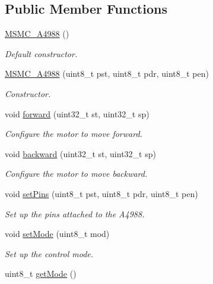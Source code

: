\subsection*{Public Member Functions}
\begin{DoxyCompactItemize}
\item 
\hyperlink{class_m_s_m_c___a4988_a3ea9fb71304c6a21695947fde680ee48}{M\+S\+M\+C\+\_\+\+A4988} ()
\begin{DoxyCompactList}\small\item\em Default constructor. \end{DoxyCompactList}\item 
\hyperlink{class_m_s_m_c___a4988_af2633e82e29d622a4fb5b5f8f6b77446}{M\+S\+M\+C\+\_\+\+A4988} (uint8\+\_\+t pst, uint8\+\_\+t pdr, uint8\+\_\+t pen)
\begin{DoxyCompactList}\small\item\em Constructor. \end{DoxyCompactList}\item 
void \hyperlink{class_m_s_m_c___a4988_a9acdbabf546656a6436e89579e8fcfca}{forward} (uint32\+\_\+t st, uint32\+\_\+t sp)
\begin{DoxyCompactList}\small\item\em Configure the motor to move forward. \end{DoxyCompactList}\item 
void \hyperlink{class_m_s_m_c___a4988_a836bed9e28e723ead2a94446bb704869}{backward} (uint32\+\_\+t st, uint32\+\_\+t sp)
\begin{DoxyCompactList}\small\item\em Configure the motor to move backward. \end{DoxyCompactList}\item 
void \hyperlink{class_m_s_m_c___a4988_a7aa6ddff4b561e47f09e4726b160294b}{set\+Pins} (uint8\+\_\+t pst, uint8\+\_\+t pdr, uint8\+\_\+t pen)
\begin{DoxyCompactList}\small\item\em Set up the pins attached to the A4988. \end{DoxyCompactList}\item 
void \hyperlink{class_m_s_m_c___a4988_aa4b96442c0e7d68715c2322f5bdce782}{set\+Mode} (uint8\+\_\+t mod)
\begin{DoxyCompactList}\small\item\em Set up the control mode. \end{DoxyCompactList}\item 
uint8\+\_\+t \hyperlink{class_m_s_m_c___a4988_ab0004d7e88ada9fc74b21fd5886bdb54}{get\+Mode} ()

\end{DoxyCompactItemize}
